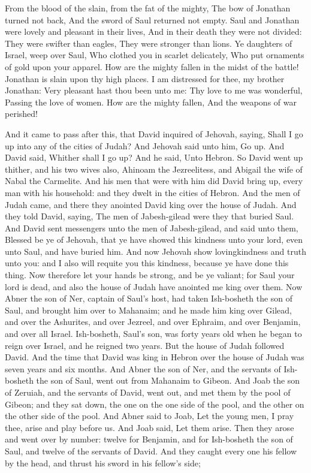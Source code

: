 From the blood of the slain, from the fat of the mighty, The bow of Jonathan turned not back, And the sword of Saul returned not empty.  Saul and Jonathan were lovely and pleasant in their lives, And in their death they were not divided: They were swifter than eagles, They were stronger than lions.  Ye daughters of Israel, weep over Saul, Who clothed you in scarlet delicately, Who put ornaments of gold upon your apparel.  How are the mighty fallen in the midst of the battle! Jonathan is slain upon thy high places.  I am distressed for thee, my brother Jonathan: Very pleasant hast thou been unto me: Thy love to me was wonderful, Passing the love of women.  How are the mighty fallen, And the weapons of war perished! 

And it came to pass after this, that David inquired of Jehovah, saying, Shall I go up into any of the cities of Judah? And Jehovah said unto him, Go up. And David said, Whither shall I go up? And he said, Unto Hebron. So David went up thither, and his two wives also, Ahinoam the Jezreelitess, and Abigail the wife of Nabal the Carmelite. And his men that were with him did David bring up, every man with his household: and they dwelt in the cities of Hebron. And the men of Judah came, and there they anointed David king over the house of Judah. And they told David, saying, The men of Jabesh-gilead were they that buried Saul. And David sent messengers unto the men of Jabesh-gilead, and said unto them, Blessed be ye of Jehovah, that ye have showed this kindness unto your lord, even unto Saul, and have buried him. And now Jehovah show lovingkindness and truth unto you: and I also will requite you this kindness, because ye have done this thing. Now therefore let your hands be strong, and be ye valiant; for Saul your lord is dead, and also the house of Judah have anointed me king over them.  Now Abner the son of Ner, captain of Saul’s host, had taken Ish-bosheth the son of Saul, and brought him over to Mahanaim; and he made him king over Gilead, and over the Ashurites, and over Jezreel, and over Ephraim, and over Benjamin, and over all Israel. Ish-bosheth, Saul’s son, was forty years old when he began to reign over Israel, and he reigned two years. But the house of Judah followed David. And the time that David was king in Hebron over the house of Judah was seven years and six months.  And Abner the son of Ner, and the servants of Ish-bosheth the son of Saul, went out from Mahanaim to Gibeon. And Joab the son of Zeruiah, and the servants of David, went out, and met them by the pool of Gibeon; and they sat down, the one on the one side of the pool, and the other on the other side of the pool. And Abner said to Joab, Let the young men, I pray thee, arise and play before us. And Joab said, Let them arise. Then they arose and went over by number: twelve for Benjamin, and for Ish-bosheth the son of Saul, and twelve of the servants of David. And they caught every one his fellow by the head, and thrust his sword in his fellow’s side; 